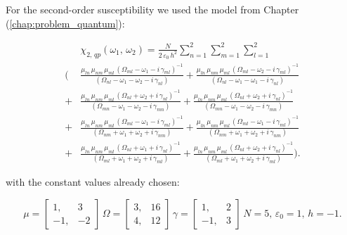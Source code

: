 \documentclass[12pt,twoside,a4paper]{article}
\numberwithin{equation}{subsection}
\numberwithin{figure}{subsection}
\begin{document}
For the second-order susceptibility we used the model from Chapter (\ref{chap:problem_quantum}):

\begin{equation}  \label{eq:nclin_chipp2}
  \begin{split} 
     & \chi_{2, \, qp}(\omega_1, \, \omega_2 ) = 
    \frac{N} {2 \, \varepsilon_0 \, h^2} \sum_{n=1}^{2} \sum_{m=1}^{2} \sum_{l=1}^{2} 
    \\ ( & \frac {{\mu_{ln}} \, {\mu_{nm}} \, {\mu_{ml}} \, ({\Omega_{ml}} - \omega_1 - i \, {\gamma_{ml}})^{-1} }
        {({\Omega_{nl}} - \omega_1 - \omega_2 - i \, {\gamma_{nl}}) }
       + \frac {{\mu_{ln}} \, {\mu_{nm}} \, {\mu_{ml}} \, ({\Omega_{ml}} - \omega_2 - i \, {\gamma_{ml}})^{-1} }
        {({\Omega_{nl}} - \omega_1 - \omega_1 - i \, {\gamma_{nl}}) } 
    \\ + & \frac {{\mu_{ln}} \, {\mu_{nm}} \, {\mu_{ml}} \, ({\Omega_{nl}} + \omega_2 + i \, {\gamma_{nl}})^{-1} }
        {({\Omega_{mn}} - \omega_1 - \omega_2 - i \, {\gamma_{mn}}) } 
       + \frac {{\mu_{ln}} \, {\mu_{nm}} \, {\mu_{ml}} \, ({\Omega_{nl}} + \omega_2 + i \, {\gamma_{nl}})^{-1} }
        {({\Omega_{mn}} - \omega_1 - \omega_2 - i \, {\gamma_{mn}}) } 
    \\ + & \frac {{\mu_{ln}} \, {\mu_{nm}} \, {\mu_{ml}} \, ({\Omega_{ml}} - \omega_1 - i \, {\gamma_{ml}})^{-1} }
        {({\Omega_{nm}} + \omega_1 + \omega_2 + i \, {\gamma_{nm}}) } 
       + \frac {{\mu_{ln}} \, {\mu_{nm}} \, {\mu_{ml}} \, ({\Omega_{ml}} - \omega_1 - i \, {\gamma_{ml}})^{-1} }
        {({\Omega_{nm}} + \omega_1 + \omega_2 + i \, {\gamma_{nm}}) } 
    \\ + & \frac {{\mu_{ln}} \, {\mu_{nm}} \, {\mu_{ml}} \, ({\Omega_{nl}} + \omega_1 + i \, {\gamma_{nl}})^{-1} }
        {({\Omega_{ml}} + \omega_1 + \omega_2 + i \, {\gamma_{ml}}) } 
       + \frac {{\mu_{ln}} \, {\mu_{nm}} \, {\mu_{ml}} \, ({\Omega_{nl}} + \omega_2 + i \, {\gamma_{nl}})^{-1} }
        {({\Omega_{ml}} + \omega_1 + \omega_2 + i \, {\gamma_{ml}})}).
  \end{split} 
\end{equation}

with the constant values already chosen:

\begin{equation} \label{eq:nclin_const2}
  \mu = \begin{bmatrix} 
    1, & 3 \\ -1, & -2 
  \end{bmatrix} \, 
  \Omega = \begin{bmatrix} 
    3, & 16 \\ 4, & 12 
  \end{bmatrix} \,
  \gamma = \begin{bmatrix} 
  1, & 2 \\ -1, & 3
  \end{bmatrix} \, 
  N = 5, \, 
  \varepsilon_0 = 1, \,
  h= - 1.
\end{equation}
\end{document}
